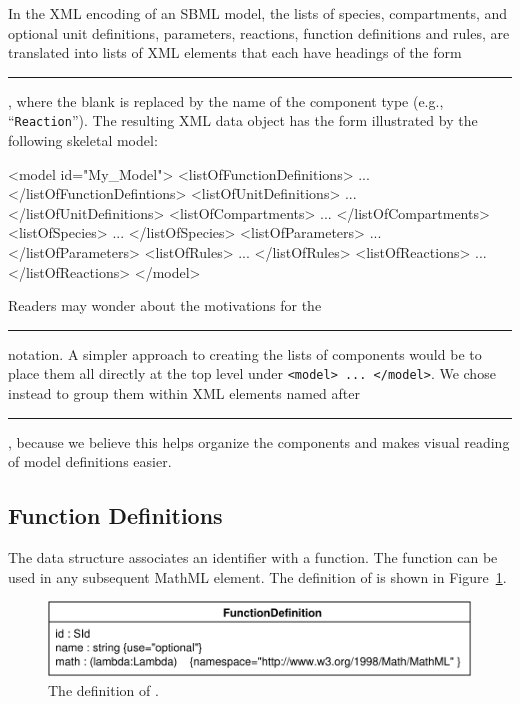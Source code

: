 \documentclass[10pt,twocolumntoc]{cekarticle}
\begin{document}
In the XML encoding of an SBML model, the lists of species,
compartments, and optional unit definitions, parameters,
reactions, function definitions and rules, are translated into
lists of XML elements that each have headings of the form
\rule{0.5in}{0.5pt}, where the blank is
replaced by the name of the component type (e.g.,
``\texttt{Reaction}'').  The resulting XML data object has the
form illustrated by the following skeletal model:

\begin{example}
<model id="My_Model">
    <listOfFunctionDefinitions>
        ...
    </listOfFunctionDefintions>
    <listOfUnitDefinitions>
        ...
    </listOfUnitDefinitions>
    <listOfCompartments>
        ...
    </listOfCompartments>
    <listOfSpecies>
        ...
    </listOfSpecies>
    <listOfParameters>
        ...
    </listOfParameters>
    <listOfRules>
        ...
    </listOfRules>
    <listOfReactions>
        ...
    </listOfReactions>
</model>
\end{example}

Readers may wonder about the motivations for the
\rule{0.5in}{0.5pt} notation.  A simpler approach to
creating the lists of components would be to place them all directly
at the top level under \texttt{<model> ... </model>}.  We chose instead to
group them within XML elements named after
\rule{0.5in}{0.5pt}, because we believe this helps
organize the components and makes visual reading of model definitions
easier.

\subsection{Function Definitions}
\label{sec:functions}

The  data structure associates an identifier
with a function.  The function can be used in any subsequent
MathML  element.  The definition of
 is shown in
Figure~\ref{fig:mathdefinition}.        %

\begin{figure}[htb]
  \centering
  \includegraphics[scale = 0.68]{mathdefinition}
  \caption{The definition of .}
  \label{fig:mathdefinition}
\end{figure}
\end{document}
